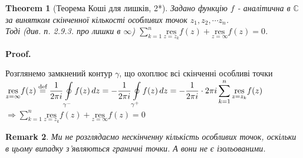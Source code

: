 \documentclass[a4paper, 10pt]{article}
\makeatletter
\def\residue#1#2{\underset{z = {#1}}{\textrm{res}} {#2}}
\def\qed{$\blacksquare$}
\theoremstyle{theoremdd}
\newtheorem{theorem}{Theorem}[subsection]
\theoremstyle{theoremdd}
\theoremstyle{theoremdd}
\theoremstyle{theoremdd}
\theoremstyle{theoremdd}
\theoremstyle{theoremdd}
\newtheorem{remark}[theorem]{Remark}
\theoremstyle{theoremdd}
\theoremstyle{theoremdd}
\renewenvironment{proof}[1][Proof.\\]{\par
\pushQED{\hfill \qed}%
\normalfont \topsep6\p@\@plus6\p@\relax
\trivlist
\item\relax
{\bfseries
#1\@addpunct{.}}\hspace\labelsep\ignorespaces
}{%
\popQED\endtrivlist\@endpefalse
}
\makeatother
\begin{document}
\begin{theorem}[Теорема Коші для лишків, 2*]
Задано функцію $f$ - аналітична в $\mathbb{C}$ за винятком скінченної кількості особливих точок $z_1,z_2,\cdots z_n$. \\
Тоді (див. п. 2.9.3. про лишки в $\infty$) $\displaystyle\sum_{k=1}^{n} \residue{z_k}{f(z)} + \residue{\infty}{f(z)} = 0$.
\end{theorem}

\begin{proof}
Розглянемо замкнений контур $\gamma$, що охоплює всі скінченні особливі точки\\
$\displaystyle \residue{\infty}{f(z)} \overset{\text{def}}{=} \frac{1}{2 \pi i} \oint\displaylimits_{\gamma^-} f(z) \,dz = -\frac{1}{2 \pi i} \oint\displaylimits_{\gamma^+} f(z) \,dz = -\frac{1}{2 \pi i} \cdot 2 \pi i\sum_{k=1}^{n}  \residue{z_k}{f(z)}$\\
$\Rightarrow\displaystyle \sum_{k=1}^{n} \residue{z_k}{f(z)} + \residue{\infty}{f(z)} = 0$
\end{proof}

\begin{remark}
Ми не розглядаємо нескінченну кількість особливих точок, оскільки в цьому випадку з'являються граничні точки. А вони не є ізольованими.
\end{remark}
\end{document}
